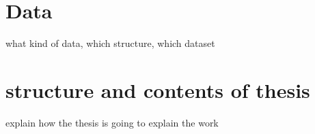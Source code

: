 \documentclass[thesis.tex]{subfiles}
\begin{document}
\section{Data}
what kind of data, which structure, which dataset
\section{structure and contents of thesis}
explain how the thesis is going to explain the work

\subfilebib %
\end{document}
